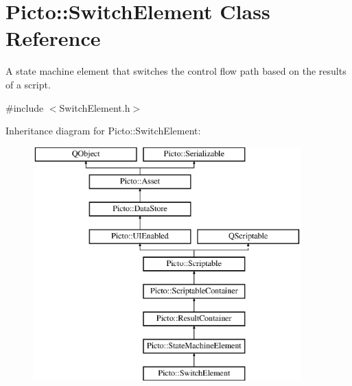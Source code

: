\hypertarget{class_picto_1_1_switch_element}{\section{Picto\-:\-:Switch\-Element Class Reference}
\label{class_picto_1_1_switch_element}
}


A state machine element that switches the control flow path based on the results of a script.  




{\ttfamily \#include $<$Switch\-Element.\-h$>$}

Inheritance diagram for Picto\-:\-:Switch\-Element\-:\begin{figure}[H]
\begin{center}
\leavevmode
\includegraphics[height=9.000000cm]{class_picto_1_1_switch_element}
\end{center}
\end{figure}

